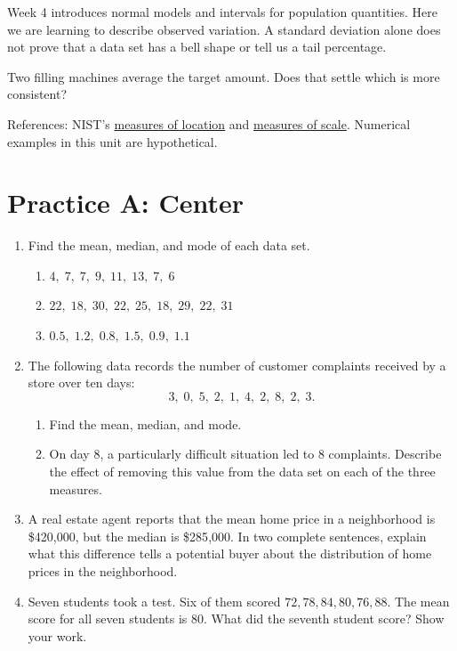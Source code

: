 Week 4 introduces normal models and intervals for population quantities. Here we are learning to describe observed variation. A standard deviation alone does not prove that a data set has a bell shape or tell us a tail percentage.


\begin{tcolorbox}[title={Pause and try 11},breakable]
Two filling machines average the target amount. Does that settle which is more consistent?
\end{tcolorbox}

References: NIST's \href{https://www.itl.nist.gov/div898/handbook/eda/section3/eda351.htm}{measures of location} and \href{https://www.itl.nist.gov/div898/handbook/eda/section3/eda356.htm}{measures of scale}. Numerical examples in this unit are hypothetical.



\section*{Practice A: Center}
\begin{enumerate}[label=A\arabic*.,leftmargin=2.5em,itemsep=10pt]
  \item Find the mean, median, and mode of each data set.
    \begin{enumerate}[label=(\alph*), itemsep=5pt]
      \item $4,\; 7,\; 7,\; 9,\; 11,\; 13,\; 7,\; 6$
      \item $22,\; 18,\; 30,\; 22,\; 25,\; 18,\; 29,\;
             22,\; 31$
      \item $0.5,\; 1.2,\; 0.8,\; 1.5,\; 0.9,\; 1.1$
    \end{enumerate}

  \item The following data records the number of customer
    complaints received by a store over ten days:
    \[ 3,\; 0,\; 5,\; 2,\; 1,\; 4,\; 2,\; 8,\; 2,\; 3. \]
    \begin{enumerate}[label=(\alph*), itemsep=4pt]
      \item Find the mean, median, and mode.
      \item On day 8, a particularly difficult situation led
        to 8 complaints. Describe the effect of removing this
        value from the data set on each of the three measures.
    \end{enumerate}

  \item A real estate agent reports that the mean home price
    in a neighborhood is \$420{,}000, but the median is
    \$285{,}000.
    In two complete sentences, explain what this difference
    tells a potential buyer about the distribution of home
    prices in the neighborhood.

  \item Seven students took a test. Six of them scored
    $72, 78, 84, 80, 76, 88$.
    The mean score for all seven students is $80$.
    What did the seventh student score?
    Show your work.

\end{enumerate}

